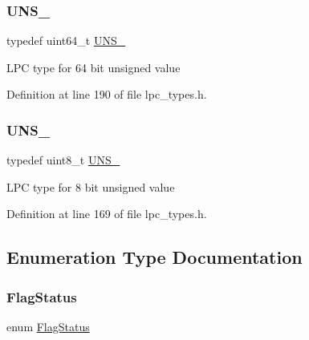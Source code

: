 \mbox{\label{group___l_p_c___types___public___types_ga2299199b92f0535ad8c2e2d8c7c7f09b}} 
\subsubsection{\texorpdfstring{U\+N\+S\+\_}{UNS\_64}}
{\footnotesize\ttfamily typedef uint64\+\_\+t \hyperlink{group___l_p_c___types___public___types_ga2299199b92f0535ad8c2e2d8c7c7f09b}{U\+N\+S\+\_}}

L\+PC type for 64 bit unsigned value 

Definition at line 190 of file lpc\+\_\+types.\+h.

\mbox{\label{group___l_p_c___types___public___types_ga7353117656180c64d2216c874998b98b}} 
\subsubsection{\texorpdfstring{U\+N\+S\+\_}{UNS\_8}}
{\footnotesize\ttfamily typedef uint8\+\_\+t \hyperlink{group___l_p_c___types___public___types_ga7353117656180c64d2216c874998b98b}{U\+N\+S\+\_}}

L\+PC type for 8 bit unsigned value 

Definition at line 169 of file lpc\+\_\+types.\+h.



\subsection{Enumeration Type Documentation}
\mbox{\label{group___l_p_c___types___public___types_ga89136caac2e14c55151f527ac02daaff}} 
\subsubsection{\texorpdfstring{Flag\+Status}{FlagStatus}}
{\footnotesize\ttfamily enum \hyperlink{group___l_p_c___types___public___types_ga89136caac2e14c55151f527ac02daaff}{Flag\+Status}}



